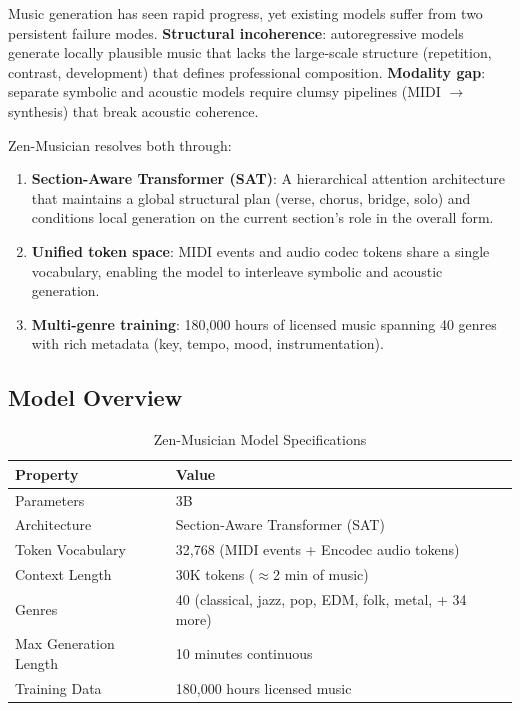 \documentclass[11pt,a4paper]{article}
\begin{document}
Music generation has seen rapid progress, yet existing models suffer from two persistent failure
modes. \textbf{Structural incoherence}: autoregressive models generate locally plausible music
that lacks the large-scale structure (repetition, contrast, development) that defines
professional composition. \textbf{Modality gap}: separate symbolic and acoustic models require
clumsy pipelines (MIDI $\to$ synthesis) that break acoustic coherence.

Zen-Musician resolves both through:

\begin{enumerate}
    \item \textbf{Section-Aware Transformer (SAT)}: A hierarchical attention architecture that
    maintains a global structural plan (verse, chorus, bridge, solo) and conditions local
    generation on the current section's role in the overall form.
    \item \textbf{Unified token space}: MIDI events and audio codec tokens share a single
    vocabulary, enabling the model to interleave symbolic and acoustic generation.
    \item \textbf{Multi-genre training}: 180,000 hours of licensed music spanning 40 genres
    with rich metadata (key, tempo, mood, instrumentation).
\end{enumerate}

\subsection{Model Overview}

\begin{table}[H]
\centering
\begin{tabular}{ll}
\toprule
\textbf{Property} & \textbf{Value} \\
\midrule
Parameters & 3B \\
Architecture & Section-Aware Transformer (SAT) \\
Token Vocabulary & 32,768 (MIDI events + Encodec audio tokens) \\
Context Length & 30K tokens ($\approx$2 min of music) \\
Genres & 40 (classical, jazz, pop, EDM, folk, metal, + 34 more) \\
Max Generation Length & 10 minutes continuous \\
Training Data & 180,000 hours licensed music \\
\bottomrule
\end{tabular}
\caption{Zen-Musician Model Specifications}
\end{table}
\end{document}
